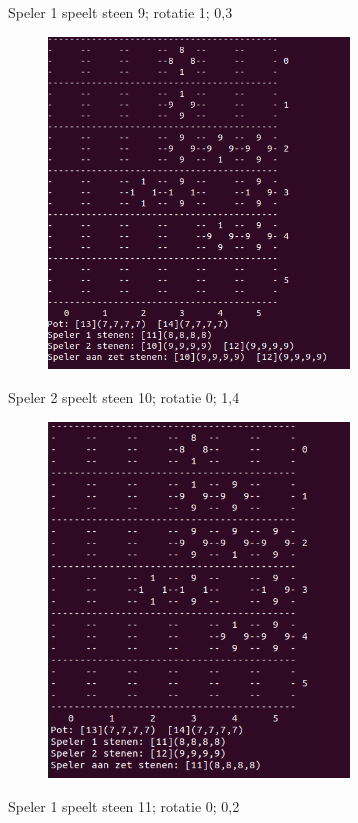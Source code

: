 \documentclass{article}
\begin{document}
\newpage
Speler 1 speelt steen 9; rotatie 1; 0,3
\begin{figure}[htp]
    \centering
    \includegraphics[width=8cm]{algo1/imgs/four_2.png}
    \label{fig:galaxy}
\end{figure}
\newpage
Speler 2 speelt steen 10; rotatie 0; 1,4
\begin{figure}[htp]
    \centering
    \includegraphics[width=8cm]{algo1/imgs/five_2.png}
    \label{fig:galaxy}
\end{figure}
\newpage
Speler 1 speelt steen 11; rotatie 0; 0,2
\end{document}
